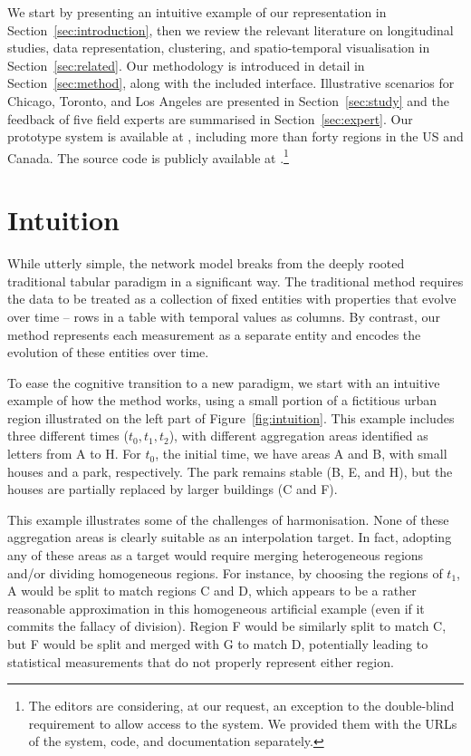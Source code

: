We start by presenting an intuitive example of our representation in
Section~\ref{sec:introduction}, then we review the relevant literature on
longitudinal studies, data representation, clustering, and spatio-temporal
visualisation in Section~\ref{sec:related}. Our methodology is introduced in
detail in Section~\ref{sec:method}, along with the included interface.
Illustrative scenarios for Chicago, Toronto, and Los Angeles are presented in
Section~\ref{sec:study} and the feedback of five field experts are summarised in
Section~\ref{sec:expert}. Our prototype system is available at
, including more than forty regions in the
US and Canada. The source code is publicly available at
.\footnote{The editors are
considering, at our request, an exception to the double-blind requirement to
allow access to the system. We provided them with the URLs of the system, code,
and documentation separately.}


\section{Intuition}
\label{sec:intuition}
While utterly simple, the network model breaks from the deeply rooted
traditional tabular paradigm in a significant way. The traditional method requires the data to be treated as a collection of fixed entities with properties that evolve over time -- rows in a table with temporal values as columns. By contrast, our method represents each measurement as a separate entity and encodes the evolution of these entities over time.

To ease the cognitive transition to a new paradigm, we start with an intuitive example of how the method
works, using a small portion of a fictitious urban region illustrated on the
left part of Figure~\ref{fig:intuition}. This example includes three different
times ($t_0,t_1,t_2$), with different aggregation areas identified as letters
from A to H. For $t_0$, the initial time, we have areas A and B, with small
houses and a park, respectively. The park remains stable (B, E, and H), but the
houses are partially replaced by larger buildings (C and F). 

This example illustrates some of the challenges of harmonisation. None of
these aggregation areas is clearly suitable as an interpolation target. In fact,
adopting any of these areas as a target would require merging heterogeneous
regions and/or dividing homogeneous regions. For instance, by choosing the
regions of $t_1$, A would be split to match regions C and D, which appears to be
a rather reasonable approximation in this homogeneous artificial example (even if it commits the fallacy of division). Region F would be similarly split to match C, but F
would be split and merged with G to match D, potentially leading to statistical
measurements that do not properly represent either region. 

